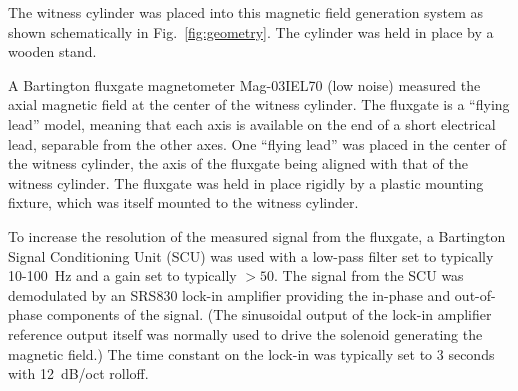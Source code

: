 

The witness cylinder was placed into this magnetic field generation
system as shown schematically in Fig.~\ref{fig:geometry}.  The
cylinder was held in place by a wooden stand.

A Bartington fluxgate magnetometer Mag-03IEL70 (low noise) measured
the axial magnetic field at the center of the witness cylinder.  The
fluxgate is a ``flying lead'' model, meaning that each axis is
available on the end of a short electrical lead, separable from the
other axes.  One ``flying lead'' was placed in the center of the
witness cylinder, the axis of the fluxgate being aligned with that of
the witness cylinder.  The fluxgate was held in place rigidly by a
plastic mounting fixture, which was itself mounted to the witness
cylinder.


To increase the resolution of the measured signal from the fluxgate, a
Bartington Signal Conditioning Unit (SCU) was used with a low-pass
filter set to typically 10-100~Hz and a gain set to typically $>50$.
The signal from the SCU was demodulated by an SRS830 lock-in amplifier
providing the in-phase and out-of-phase components of the signal.
(The sinusoidal output of the lock-in amplifier reference output
itself was normally used to drive the solenoid generating the magnetic
field.)  The time constant on the lock-in was typically set to 3
seconds with 12~dB/oct rolloff.

